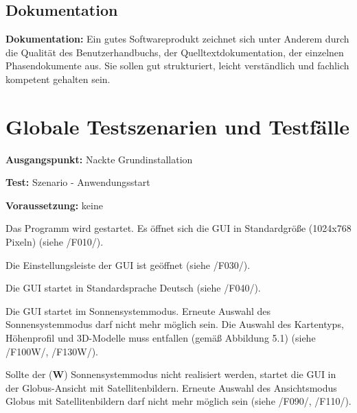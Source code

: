 \documentclass[10pt]{scrreprt}
\newcommand{\sfbf}[1]{\textbf{\sffamily #1}}
\newcommand{\W}{\sfbf{W}}
\newcommand{\ziel}[1]{{\fontsize{9.5}{11}\textsf{/#1/}}}
\newcommand{\ziellabel}{Z}
\newcommand{\muss}{\renewcommand{\labelenumi}{\textbf{\ziel{\ziellabel\numprint{\theenumi}0}}}}
\newcommand{\wunsch}{\renewcommand{\labelenumi}{\textbf{\ziel{\ziellabel\numprint{\theenumi}0W}}}}
\newenvironment{details}[1][6pt]{%
  \parskip#1 \parindent6mm \raggedright%
  \def\item{\par\ignorespaces\hangindent=5mm \hangafter1}}{%
  \par\ignorespaces}
\begin{document}
\section*{Dokumentation}
\begin{details}
\item \sfbf{Dokumentation:} Ein gutes Softwareprodukt zeichnet sich unter Anderem durch die Qualität des Benutzerhandbuchs, der Quelltextdokumentation, der einzelnen Phasendokumente aus. Sie sollen gut strukturiert, leicht verständlich und fachlich kompetent gehalten sein. 
\end{details}




\chapter{Globale Testszenarien und Testfälle}

\renewcommand{\ziellabel}{T}

\begin{details}[2pt]
\item \sfbf{Ausgangspunkt:} Nackte Grundinstallation 
\item \sfbf{Test:} Szenario - Anwendungsstart 
\item \sfbf{Voraussetzung:} keine
\end{details}
\vspace{2mm}
\begin{enumerate}[leftmargin = 2.2cm]
\item Das Programm wird gestartet. Es öffnet sich die GUI in Standardgröße (1024x768 Pixeln) (siehe \ziel{F010}).
\item Die Einstellungsleiste der GUI ist geöffnet (siehe \ziel{F030}).
\item Die GUI startet in Standardsprache Deutsch (siehe \ziel{F040}).
\wunsch
\item Die GUI startet im Sonnensystemmodus. Erneute Auswahl des Sonnensystemmodus darf nicht mehr möglich sein. Die Auswahl des Kartentyps, Höhenprofil und 3D-Modelle muss entfallen (gemäß Abbildung 5.1) (siehe \ziel{F100W}, \ziel{F130W}).
\muss
\item Sollte der (\W) Sonnensystemmodus nicht realisiert werden, startet die GUI in der Globus-Ansicht mit Satellitenbildern. Erneute Auswahl des Ansichtsmodus Globus mit Satellitenbildern darf nicht mehr möglich sein (siehe \ziel{F090}, \ziel{F110}).
\end{enumerate}
\end{document}
